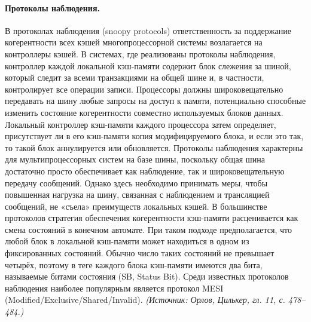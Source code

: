 \documentclass[a4paper,12pt]{article}
\begin{document}
\paragraph{Протоколы наблюдения.}
В протоколах наблюдения (snoopy protocols) ответственность за поддержание когерентности всех кэшей многопроцессорной системы возлагается на контроллеры кэшей. В системах, где реализованы протоколы наблюдения, контроллер каждой локальной кэш-памяти содержит блок слежения за шиной, который следит за всеми транзакциями на общей шине и, в частности, контролирует все операции записи. Процессоры должны широковещательно передавать на шину любые запросы на доступ к памяти, потенциально способные изменить состояние когерентности совместно используемых блоков данных. Локальный контроллер кэш-памяти каждого процессора затем определяет, присутствует ли в его кэш-памяти копия модифицируемого блока, и если это так, то такой блок аннулируется или обновляется. Протоколы наблюдения характерны для мультипроцессорных систем на базе шины, поскольку общая шина достаточно просто обеспечивает как наблюдение, так и широковещательную передачу сообщений. Однако здесь необходимо принимать меры, чтобы повышенная нагрузка на шину, связанная с наблюдением и трансляцией сообщений, не «съела» преимуществ локальных кэшей. В большинстве протоколов стратегия обеспечения когерентности кэш-памяти расценивается как смена состояний в конечном автомате. При таком подходе предполагается, что любой блок в локальной кэш-памяти может находиться в одном из фиксированных состояний. Обычно число таких состояний не превышает четырёх, поэтому в теге каждого блока кэш-памяти имеются два бита, называемые битами состояния (SB, Status Bit). Среди известных протоколов наблюдения наиболее популярным является протокол MESI (Modified/Exclusive/Shared/Invalid).
\textit{(Источник: Орлов, Цилькер, гл. 11, с. 478--484.)}
\end{document}

